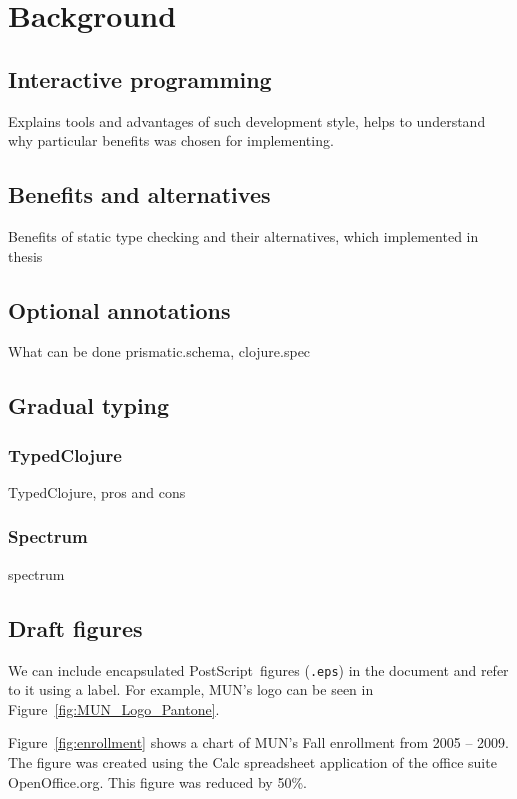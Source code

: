 \chapter{Background}
\label{chap:background}

\section{Interactive programming}
Explains tools and advantages of such development style, helps to understand why
particular benefits was chosen for implementing.

\section{Benefits and alternatives}
Benefits of static type checking and their alternatives, which implemented in thesis


\section{Optional annotations}
What can be done prismatic.schema, clojure.spec

\section{Gradual typing}
\subsection{TypedClojure}
TypedClojure, pros and cons
\subsection{Spectrum}
spectrum

\section{Draft figures}

We can include encapsulated PostScript\texttrademark\ figures
(\texttt{.eps}) in the document and refer to it using a label.
For example, MUN's logo can be seen in Figure~\ref{fig:MUN_Logo_Pantone}.

Figure~\ref{fig:enrollment} shows a chart of MUN's Fall
enrollment from 2005 -- 2009.
The figure was created using the \textsf{Calc} spreadsheet application of
the office suite \textsf{OpenOffice.org}.  This figure was reduced by 50\%.


